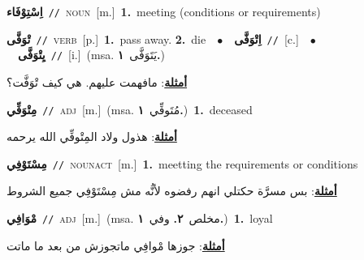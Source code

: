 \documentclass[10pt,a4paper,twoside]{article} %
\begin{document}
\begin{multicols}{2}
{\setlength\topsep{0pt}\textbf{\foreignlanguage{arabic}{اِسْتِوْفَاء}}\ {\color{gray}\texttt{//}\color{black}}\ \textsc{noun}\ [m.]\ \textbf{1.}~meeting (conditions or requirements)\ } \vspace{2mm}

{\setlength\topsep{0pt}\textbf{\foreignlanguage{arabic}{تْوَفَّى}}\ {\color{gray}\texttt{//}\color{black}}\ \textsc{verb}\ [p.]\ \textbf{1.}~pass away.  \textbf{2.}~die\ \ $\bullet$\ \ \setlength\topsep{0pt}\textbf{\foreignlanguage{arabic}{اِتْوَفَّى}}\ {\color{gray}\texttt{//}\color{black}}\ [c.]\ \ $\bullet$\ \ \setlength\topsep{0pt}\textbf{\foreignlanguage{arabic}{يِتْوَفَّى}}\ {\color{gray}\texttt{//}\color{black}}\ [i.]\ \color{gray}(msa. \foreignlanguage{arabic}{يَتَوَفَّى}~\foreignlanguage{arabic}{\textbf{١.}})\color{black}\  \begin{flushright}\color{gray}\foreignlanguage{arabic}{\textbf{\underline{\foreignlanguage{arabic}{أمثلة}}}: مافهمت عليهم. هي كيف تْوَفَّت؟}\end{flushright}\color{black}} \vspace{2mm}

{\setlength\topsep{0pt}\textbf{\foreignlanguage{arabic}{مِتْوَفِّي}}\ {\color{gray}\texttt{//}\color{black}}\ \textsc{adj}\ [m.]\ \color{gray}(msa. \foreignlanguage{arabic}{مُتَوفِّي}~\foreignlanguage{arabic}{\textbf{١.}})\color{black}\ \textbf{1.}~deceased\  \begin{flushright}\color{gray}\foreignlanguage{arabic}{\textbf{\underline{\foreignlanguage{arabic}{أمثلة}}}: هذول ولاد المِتْوفِّي الله يرحمه}\end{flushright}\color{black}} \vspace{2mm}

{\setlength\topsep{0pt}\textbf{\foreignlanguage{arabic}{مِسْتَوْفِي}}\ {\color{gray}\texttt{//}\color{black}}\ \textsc{noun\textunderscore act}\ [m.]\ \textbf{1.}~meetting the requirements or conditions\  \begin{flushright}\color{gray}\foreignlanguage{arabic}{\textbf{\underline{\foreignlanguage{arabic}{أمثلة}}}: بس مسرَّة حكتلي انهم رفضوه لأنُّه مش مِسْتَوْفِي جميع الشروط}\end{flushright}\color{black}} \vspace{2mm}

{\setlength\topsep{0pt}\textbf{\foreignlanguage{arabic}{مْوَافِي}}\ {\color{gray}\texttt{//}\color{black}}\ \textsc{adj}\ [m.]\ \color{gray}(msa. \foreignlanguage{arabic}{مخلص}~\foreignlanguage{arabic}{\textbf{٢.}}  \foreignlanguage{arabic}{وفي}~\foreignlanguage{arabic}{\textbf{١.}})\color{black}\ \textbf{1.}~loyal\  \begin{flushright}\color{gray}\foreignlanguage{arabic}{\textbf{\underline{\foreignlanguage{arabic}{أمثلة}}}: جوزها مْوافِي ماتجوزش من بعد ما ماتت}\end{flushright}\color{black}} \vspace{2mm}


\end{multicols}
\end{document}
